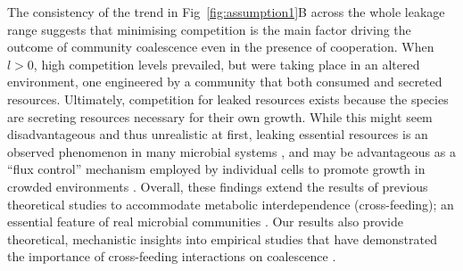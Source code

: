 \documentclass[10pt,letterpaper]{article}
\begin{document}

The consistency of the trend in Fig~\ref{fig:assumption1}B across the whole leakage range suggests that minimising competition is the main factor driving the outcome of community coalescence even in the presence of cooperation. When $l > 0$, high competition levels prevailed, but were taking place in an altered environment, one engineered by a community that both consumed and secreted resources. Ultimately, competition for leaked resources exists because the species are secreting resources necessary for their own growth. While this might seem disadvantageous and thus unrealistic at first, leaking essential resources is an observed phenomenon in many microbial systems \cite{Paczia2012, Silva2015}, and may be advantageous as a ``flux control'' mechanism employed by individual cells to promote growth in crowded environments \cite{Yamagishi2020, Yamagishi2020a}. Overall, these findings extend the results of previous theoretical studies to accommodate metabolic interdependence (cross-feeding); an essential feature of real microbial communities \cite{Machado, Pascual-Garcia2020}.  Our results also provide theoretical, mechanistic insights into empirical studies that have demonstrated the importance of cross-feeding interactions on coalescence \cite{Sierocinski2017}.
\end{document}
